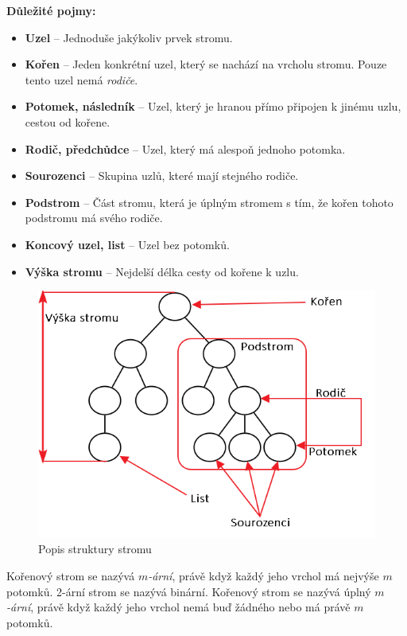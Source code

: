 \documentclass[
  biblatex=false,
  font=serif,
  glossaries=false,
  tables=false,
  theorems=false,
  index
]{kidiplom}
\begin{document}
\newpage
\noindent \textbf{Důležité pojmy:}
\begin{itemize}
\item \textbf{Uzel} -- Jednoduše jakýkoliv prvek stromu.
\item \textbf{Kořen} -- Jeden konkrétní uzel, který se nachází na vrcholu stromu. Pouze tento uzel nemá \textit{rodiče}. 
\item \textbf{Potomek, následník} -- Uzel, který je hranou přímo připojen k jinému uzlu, cestou od kořene.
\item \textbf{Rodič, předchůdce} -- Uzel, který má alespoň jednoho potomka.
\item \textbf{Sourozenci} -- Skupina uzlů, které mají stejného rodiče.
\item \textbf{Podstrom} -- Část stromu, která je úplným stromem s tím, že kořen tohoto podstromu má svého rodiče.
\item \textbf{Koncový uzel, list} -- Uzel bez potomků. 
\item \textbf{Výška stromu} -- Nejdelší délka cesty od kořene k uzlu.
\end{itemize} 

\begin{figure}[h!]
\centering
	\includegraphics[scale=0.6]{obrazky/2PopisStromu.png}
	\caption{Popis struktury stromu}
\end{figure}

\begin{definition}
Kořenový strom se nazývá $m$\textit{-ární}, právě když každý jeho vrchol má nejvýše $m$ potomků. 2-ární strom se nazývá binární. Kořenový strom se nazývá úplný $m$\textit{-ární}, právě když každý jeho vrchol nemá buď žádného nebo má právě $m$ potomků.\cite{belohlavekVychodil}
\end{definition}
\smallskip
\end{document}
